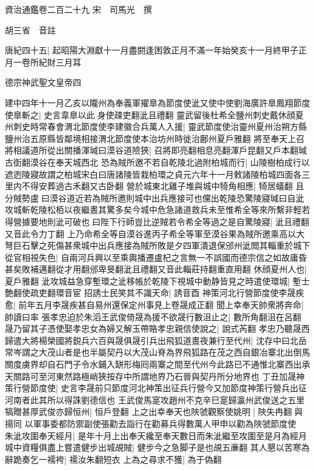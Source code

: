 資治通鑑卷二百二十九
宋　司馬光　撰

胡三省　音註

唐紀四十五|{
	起昭陽大淵獻十一月盡閼逢困敦正月不滿一年始癸亥十一月終甲子正月一卷所紀財三月耳}


德宗神武聖文皇帝四

建中四年十一月乙亥以隴州為奉義軍擢臯為節度使泚又使中使劉海廣許臯鳳翔節度使臯斬之|{
	史言韋臯以此身使疎吏翻泚且禮翻}
靈武留後杜希全鹽州刺史戴休顔夏州刺史時常春會渭北節度使李建徽合兵萬人入援|{
	靈武節度使治靈州夏州治朔方縣鹽州治五原縣皆鄰境相接渭北節度使本治坊州時徙治鄜州夏戶雅翻}
將至奉天上召將相議道所從出關播渾瑊曰漠谷道險狹|{
	召將即亮翻相息亮翻渾戶昆翻又戶本翻瑊古衘翻漠谷在奉天城西北}
恐為賊所邀不若自乾陵北過附柏城而行|{
	山陵樹柏成行以遮迾陵寢故謂之柏城宋白曰唐諸陵皆栽柏環之貞元六年十一月敕諸陵柏城四面各三里内不得安葬過古禾翻又古卧翻}
營於城東北雞子堆與城中犄角相應|{
	犄居蟻翻}
且分賊勢盧曰漠谷道近若為賊所邀則城中出兵應接可也儻出乾陵恐驚陵寢瑊曰自泚攻城斬乾陵松栢以夜繼晝其驚多矣今城中危急諸道救兵未至惟希全等來所繫非輕若得營據要地則泚可破也曰陛下行師豈比逆賊若令希全等過之是自驚陵寢|{
	泚且禮翻又音此令力丁翻}
上乃命希全等自漠谷進丙子希全等軍至漠谷果為賊所邀乘高以大弩巨石擊之死傷甚衆城中出兵應接為賊所敗是夕四軍潰退保邠州泚閲其輜重於城下從官相視失色|{
	自兩河兵興以至乘輿播遷盧杞之言無一不誤國而德宗信之如故庸昏甚矣敗補邁翻從才用翻邠卑旻翻泚且禮翻又音此輜莊持翻重直用翻}
休顔夏州人也|{
	夏戶雅翻}
泚攻城益急穿塹環之泚移帳於乾陵下視城中動静皆見之時遣使環城|{
	塹士艶翻使疏吏翻環音宦}
招誘士民笑其不識天命|{
	誘音酉}
神策河北行營節度使李晟疾愈|{
	前年五月李晟疾甚自易州還保定州事見上卷晟成正翻}
聞上幸奉天帥衆將奔命|{
	帥讀曰率}
張孝忠迫於朱滔王武俊倚晟為援不欲晟行數沮止之|{
	數所角翻沮在呂翻}
晟乃留其子憑使娶孝忠女為婦又解玉帶賂孝忠親信使說之|{
	說式芮翻}
孝忠乃聽晟西歸遣大將楊榮國將鋭兵六百與晟俱晟引兵出飛狐道晝夜兼行至代州|{
	沈存中曰北岳常岑謂之大茂山者是也半屬契丹以大茂山脊為界飛狐路在茂之西自銀冶寨北出倒馬關度虜界却自石門子令水鋪入缾形梅囘兩寨之間至代州今此路已不通惟北寨西出承天關路可至河東然路極峭狹按存中所謂地界乃石晉與契丹所分地界也}
丁丑加晟神策行營節度使|{
	史言李晟前只節度河北神策出征兵行營今又加節度神策行營兵出征河南者此其所以得誅劉德信也}
王武俊馬寔攻趙州不克辛巳寔歸瀛州武俊送之五里犒贈甚厚武俊亦歸恒州|{
	恒戶登翻}
上之出幸奉天也陜虢觀察使姚明|{
	陜失冉翻與揚同}
以軍事委都防禦副使張勸去詣行在勸募兵得數萬人甲申以勸為陜虢節度使　朱泚攻圍奉天經月|{
	是年十月上出奉天纔至奉天數日而朱泚繼至攻圍至是月為經月}
城中資糧俱盡上嘗遣健步出城覘賊|{
	健步今之急脚子是也覘五亷翻}
其人懇以苦寒為辭跪奏乞一襦袴|{
	襦汝朱翻短衣}
上為之尋求不獲|{
	為于偽翻}
